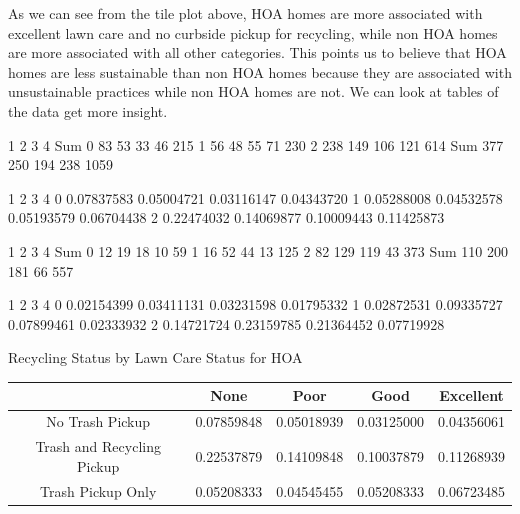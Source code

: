 \documentclass{article}
\begin{document}
As we can see from the tile plot above, HOA homes are more associated with excellent lawn care and no curbside pickup for recycling, while non HOA homes are more associated with all other categories. This points us to believe that HOA homes are less sustainable than non HOA homes because they are associated with unsustainable practices while non HOA homes are not. We can look at tables of the data get more insight. 
\begin{Schunk}
\begin{Soutput}
         1    2    3    4  Sum
  0     83   53   33   46  215
  1     56   48   55   71  230
  2    238  149  106  121  614
  Sum  377  250  194  238 1059
\end{Soutput}
\begin{Soutput}
             1          2          3          4
  0 0.07837583 0.05004721 0.03116147 0.04343720
  1 0.05288008 0.04532578 0.05193579 0.06704438
  2 0.22474032 0.14069877 0.10009443 0.11425873
\end{Soutput}
\begin{Soutput}
        1   2   3   4 Sum
  0    12  19  18  10  59
  1    16  52  44  13 125
  2    82 129 119  43 373
  Sum 110 200 181  66 557
\end{Soutput}
\begin{Soutput}
             1          2          3          4
  0 0.02154399 0.03411131 0.03231598 0.01795332
  1 0.02872531 0.09335727 0.07899461 0.02333932
  2 0.14721724 0.23159785 0.21364452 0.07719928
\end{Soutput}
\end{Schunk}

\begin{center} Recycling Status by Lawn Care Status for HOA \end{center}
\begin{table}[H]
\begin{tabular}{|c|c|c|c|c|} \hline
                           & None       & Poor       & Good       & Excellent  \\ \hline
No Trash Pickup            & 0.07859848 & 0.05018939 & 0.03125000 & 0.04356061 \\ \hline
Trash and Recycling Pickup & 0.22537879 & 0.14109848 & 0.10037879 & 0.11268939 \\ \hline
Trash Pickup Only          & 0.05208333 & 0.04545455 & 0.05208333 & 0.06723485 \\ \hline
\end{tabular}
\end{table}
\end{document}
